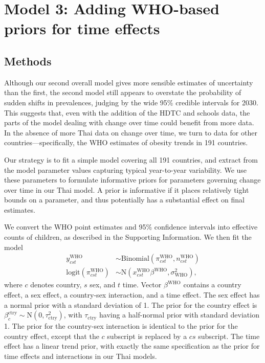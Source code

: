 \documentclass[10pt,letterpaper]{article}
\begin{document}
\hypertarget{sec:model3}{%
\section{Model 3: Adding WHO-based priors for time
effects}\label{sec:model3}}

\hypertarget{methods-2}{%
\subsection{Methods}\label{methods-2}}

Although our second overall model gives more sensible estimates of
uncertainty than the first, the second model still appears to overstate
the probability of sudden shifts in prevalences, judging by the wide
95\% credible intervals for 2030. This suggests that, even with the
addition of the HDTC and schools data, the parts of the model dealing
with change over time could benefit from more data. In the absence of
more Thai data on change over time, we turn to data for other
countries---specifically, the WHO estimates of obesity trends in 191
countries.

Our strategy is to fit a simple model covering all 191 countries, and
extract from the model parameter values capturing typical year-to-year
variability. We use these parameters to formulate informative priors for
parameters governing change over time in our Thai model. A prior is
informative if it places relatively tight bounds on a parameter, and
thus potentially has a substantial effect on final estimates.

We convert the WHO point estimates and 95\% confidence intervals into
effective counts of children, as described in the Supporting
Information. We then fit the model \begin{align}
  y_{cst}^{\text{WHO}} & \sim \text{Binomial}(\pi_{cst}^{\text{WHO}}, n_{cst}^{\text{WHO}}) \\
  \text{logit}(\pi_{cst}^{\text{WHO}}) & \sim \text{N}(x_{cst}^{\text{WHO}} \beta^{\text{WHO}}, \sigma_{\text{WHO}}^2),
\end{align} where \(c\) denotes country, \(s\) sex, and \(t\) time.
Vector \(\beta^{\text{WHO}}\) contains a country effect, a sex effect, a
country-sex interaction, and a time effect. The sex effect has a normal
prior with a standard deviation of 1. The prior for the country effect
is \(\beta_c^{\text{ctry}} \sim \text{N}(0, \tau_{\text{ctry}}^2)\),
with \(\tau_{\text{ctry}}\) having a half-normal prior with standard
deviation 1. The prior for the country-sex interaction is identical to
the prior for the country effect, except that the \(c\) subscript is
replaced by a \(cs\) subscript. The time effect has a linear trend
prior, with exactly the same specification as the prior for time effects
and interactions in our Thai models.
\end{document}
